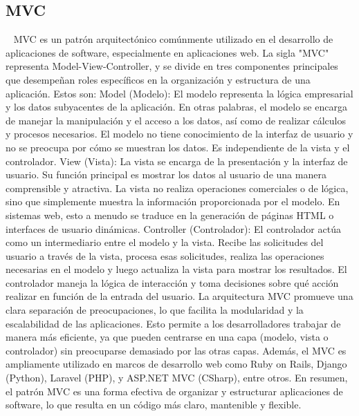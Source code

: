 \subsection{MVC}~\cite{fowler2012patterns}
MVC es un patrón arquitectónico comúnmente utilizado en el desarrollo de aplicaciones de software, especialmente en aplicaciones web. La sigla "MVC" representa Model-View-Controller, y se divide en tres componentes principales que desempeñan roles específicos en la organización y estructura de una aplicación. Estos son:
Model (Modelo): El modelo representa la lógica empresarial y los datos subyacentes de la aplicación. En otras palabras, el modelo se encarga de manejar la manipulación y el acceso a los datos, así como de realizar cálculos y procesos necesarios. El modelo no tiene conocimiento de la interfaz de usuario y no se preocupa por cómo se muestran los datos. Es independiente de la vista y el controlador.
View (Vista): La vista se encarga de la presentación y la interfaz de usuario. Su función principal es mostrar los datos al usuario de una manera comprensible y atractiva. La vista no realiza operaciones comerciales o de lógica, sino que simplemente muestra la información proporcionada por el modelo. En sistemas web, esto a menudo se traduce en la generación de páginas HTML o interfaces de usuario dinámicas.
Controller (Controlador): El controlador actúa como un intermediario entre el modelo y la vista. Recibe las solicitudes del usuario a través de la vista, procesa esas solicitudes, realiza las operaciones necesarias en el modelo y luego actualiza la vista para mostrar los resultados. El controlador maneja la lógica de interacción y toma decisiones sobre qué acción realizar en función de la entrada del usuario.
La arquitectura MVC promueve una clara separación de preocupaciones, lo que facilita la modularidad y la escalabilidad de las aplicaciones. Esto permite a los desarrolladores trabajar de manera más eficiente, ya que pueden centrarse en una capa (modelo, vista o controlador) sin preocuparse demasiado por las otras capas. Además, el MVC es ampliamente utilizado en marcos de desarrollo web como Ruby on Rails, Django (Python), Laravel (PHP), y ASP.NET MVC (CSharp), entre otros.
En resumen, el patrón MVC es una forma efectiva de organizar y estructurar aplicaciones de software, lo que resulta en un código más claro, mantenible y flexible.

